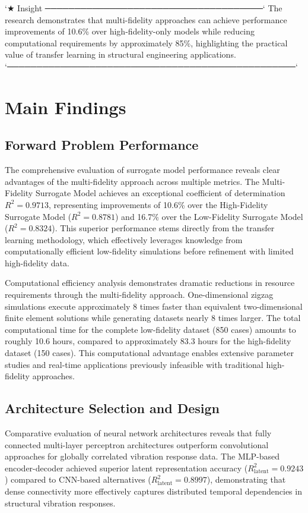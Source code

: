 `★ Insight ─────────────────────────────────────`
The research demonstrates that multi-fidelity approaches can achieve performance improvements of 10.6\% over high-fidelity-only models while reducing computational requirements by approximately 85\%, highlighting the practical value of transfer learning in structural engineering applications.
`─────────────────────────────────────────────────`

\section{Main Findings}
\subsection{Forward Problem Performance}
The comprehensive evaluation of surrogate model performance reveals clear advantages of the multi-fidelity approach across multiple metrics. The Multi-Fidelity Surrogate Model achieves an exceptional coefficient of determination $R^2 = 0.9713$, representing improvements of 10.6\% over the High-Fidelity Surrogate Model ($R^2 = 0.8781$) and 16.7\% over the Low-Fidelity Surrogate Model ($R^2 = 0.8324$). This superior performance stems directly from the transfer learning methodology, which effectively leverages knowledge from computationally efficient low-fidelity simulations before refinement with limited high-fidelity data.

Computational efficiency analysis demonstrates dramatic reductions in resource requirements through the multi-fidelity approach. One-dimensional zigzag simulations execute approximately 8 times faster than equivalent two-dimensional finite element solutions while generating datasets nearly 8 times larger. The total computational time for the complete low-fidelity dataset (850 cases) amounts to roughly 10.6 hours, compared to approximately 83.3 hours for the high-fidelity dataset (150 cases). This computational advantage enables extensive parameter studies and real-time applications previously infeasible with traditional high-fidelity approaches.

\subsection{Architecture Selection and Design}
Comparative evaluation of neural network architectures reveals that fully connected multi-layer perceptron architectures outperform convolutional approaches for globally correlated vibration response data. The MLP-based encoder-decoder achieved superior latent representation accuracy ($R^2_{\text{latent}} = 0.9243$) compared to CNN-based alternatives ($R^2_{\text{latent}} = 0.8997$), demonstrating that dense connectivity more effectively captures distributed temporal dependencies in structural vibration responses.

